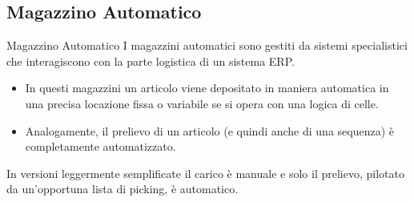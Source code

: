 \documentclass{beamer}
\begin{document}
\subsection{Magazzino Automatico}
\begin{frame}{Magazzino Automatico}
    I magazzini automatici sono gestiti da sistemi specialistici che interagiscono con la parte logistica di un sistema ERP.\\
    \begin{itemize}
        \item In questi magazzini un articolo viene depositato in maniera automatica in una precisa locazione fissa o variabile se si opera con una logica di celle.
        \item Analogamente, il prelievo di un articolo (e quindi anche di una sequenza) è completamente automatizzato.
    \end{itemize}
    In versioni leggermente semplificate il carico è manuale e solo il prelievo, pilotato da un’opportuna lista di picking, è automatico.
\end{frame}
\end{document}
